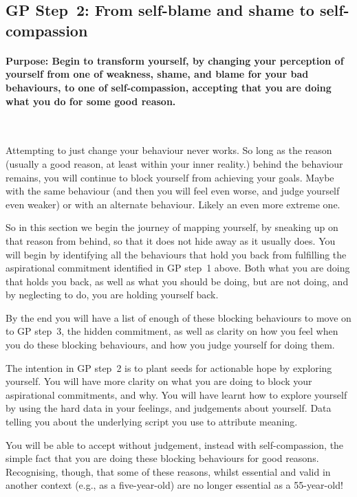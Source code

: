 \subsection{GP Step~2: From self-blame and shame to self-compassion}


\paragraph{Purpose: Begin to transform yourself, by changing your perception of yourself from one of weakness, shame, and blame for your bad behaviours, to one of self-compassion, accepting that you are doing what you do for some good reason.} ~


Attempting to just change your behaviour never works. So long as the reason (usually a good reason, at least within your inner reality.) behind the behaviour remains, you will continue to block yourself from achieving your goals. Maybe with the same behaviour (and then you will feel even worse, and judge yourself even weaker) or with an alternate behaviour. Likely an even more extreme one. 


So in this section we begin the journey of mapping yourself, by sneaking up on that reason from behind, so that it does not hide away as it usually does. You will begin by identifying all the behaviours that hold you back from fulfilling the aspirational commitment identified in GP step~1 above. Both what you are doing that holds you back, as well as what you should be doing, but are not doing, and by neglecting to do, you are holding yourself back. 


By the end you will have a list of enough of these blocking behaviours to move on to GP step~3, the hidden commitment, as well as clarity on how you feel when you do these blocking behaviours, and how you judge yourself for doing them.


The intention in GP step~2 is to plant seeds for actionable hope by exploring yourself. You will have more clarity on what you are doing to block your aspirational commitments, and why. You will have learnt how to explore yourself by using the hard data in your feelings, and judgements about yourself. Data telling you about the underlying script you use to attribute meaning. 


You will be able to accept without judgement, instead with self-compassion, the simple fact that you are doing these blocking behaviours for good reasons. Recognising, though, that some of these reasons, whilst essential and valid in another context (e.g., as a five-year-old) are no longer essential as a 55-year-old!


